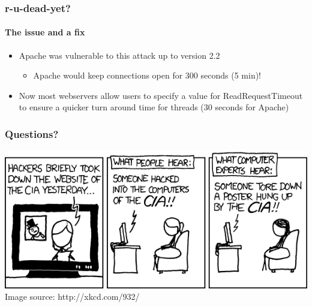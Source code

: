\documentclass{beamer}
\begin{document}
\begin{frame}
	\frametitle{r-u-dead-yet?}
	\framesubtitle{The issue and a fix}
	\begin{itemize}
		\item Apache was vulnerable to this attack up to version 2.2 
			\begin{itemize}
				\item Apache would keep connections open for 300 seconds (5 min)!
			\end{itemize}
		\item Now most webservers allow users to specify a value for
			{\ttfamily ReadRequestTimeout} to ensure a quicker turn around time for
			threads  (30 seconds for Apache)
	\end{itemize}
\end{frame}

\begin{frame}
	\frametitle{Questions?}
	\includegraphics[width=1\textwidth]{images/cia.png}
	\newline
	{\footnotesize Image source: http://xkcd.com/932/}
\end{frame}
\end{document}
